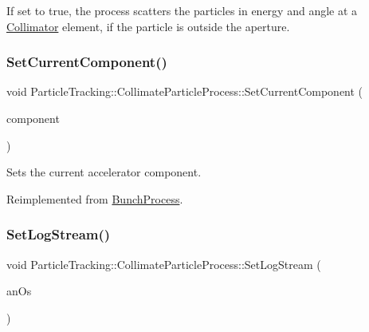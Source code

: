 If set to true, the process scatters the particles in energy and angle at a \hyperlink{classCollimator}{Collimator} element, if the particle is outside the aperture. \mbox{\label{classParticleTracking_1_1CollimateParticleProcess_ab3f22a0f67414d883f33e39dab7d763b}} 
\subsubsection{\texorpdfstring{Set\+Current\+Component()}{SetCurrentComponent()}}
{\footnotesize\ttfamily void Particle\+Tracking\+::\+Collimate\+Particle\+Process\+::\+Set\+Current\+Component (\begin{DoxyParamCaption}\item[{\hyperlink{classAcceleratorComponent}{Accelerator\+Component} \&}]{component }\end{DoxyParamCaption})\hspace{0.3cm}{\ttfamily [virtual]}}

Sets the current accelerator component. 

Reimplemented from \hyperlink{classBunchProcess}{Bunch\+Process}.

\mbox{\label{classParticleTracking_1_1CollimateParticleProcess_af9bcc2aff428281af1d79011d6978685}} 
\subsubsection{\texorpdfstring{Set\+Log\+Stream()}{SetLogStream()}}
{\footnotesize\ttfamily void Particle\+Tracking\+::\+Collimate\+Particle\+Process\+::\+Set\+Log\+Stream (\begin{DoxyParamCaption}\item[{std\+::ostream $\ast$}]{an\+Os }\end{DoxyParamCaption})\hspace{0.3cm}{\ttfamily [inline]}}

